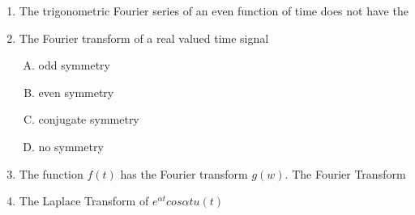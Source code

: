 \documentclass[journal,12pt,twocolumn]{IEEEtran}
\begin{document}
\begin{enumerate}[1.]
\setlength\itemsep{2em}
\item The trigonometric Fourier series of an even function of time does not have the\\

\begin{enumerate}[(A)]
\end{enumerate}

\item The Fourier transform of a real valued time signal\\

\begin{enumerate}[(A)]
\setlength\itemsep{2em}

\item odd symmetry
\item even symmetry
\item conjugate symmetry
\item no symmetry

\end{enumerate}

\item The function $f(t)$ has the Fourier transform $g(w)$. The Fourier Transform

\begin{enumerate}[(A)]
\end{enumerate}

\item The Laplace Transform of $e^{\alpha t}{cos{\alpha t} u(t)}$\\
\begin{enumerate}[(A)]
\begin{multicols}{2}


\end{multicols}
\end{enumerate}
\end{enumerate}
\end{document}
